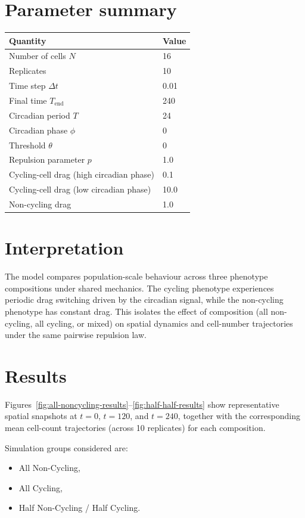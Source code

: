 \documentclass[11pt]{article}
\begin{document}
\section{Parameter summary}
\begin{center}
\begin{tabular}{@{}ll@{}}
\toprule
Quantity & Value \\
\midrule
Number of cells \(N\) & 16 \\
Replicates & 10 \\
Time step \(\Delta t\) & 0.01 \\
Final time \(T_{\text{end}}\) & 240 \\
Circadian period \(T\) & 24 \\
Circadian phase \(\phi\) & 0 \\
Threshold \(\theta\) & 0 \\
Repulsion parameter \(p\) & 1.0 \\
Cycling-cell drag (high circadian phase) & 0.1 \\
Cycling-cell drag (low circadian phase) & 10.0 \\
Non-cycling drag & 1.0 \\
\bottomrule
\end{tabular}
\end{center}

\section{Interpretation}
The model compares population-scale behaviour across three phenotype compositions
under shared mechanics. The cycling phenotype experiences periodic drag switching
driven by the circadian signal, while the non-cycling phenotype has constant drag.
This isolates the effect of composition (all non-cycling, all cycling, or mixed)
on spatial dynamics and cell-number trajectories under the same pairwise repulsion law.

\section{Results}
Figures~\ref{fig:all-noncycling-results}--\ref{fig:half-half-results} show representative
spatial snapshots at \(t=0\), \(t=120\), and \(t=240\), together with the corresponding
mean cell-count trajectories (across 10 replicates) for each composition.

Simulation groups considered are:
\begin{itemize}
  \item All Non-Cycling,
  \item All Cycling,
  \item Half Non-Cycling / Half Cycling.
\end{itemize}
\end{document}
